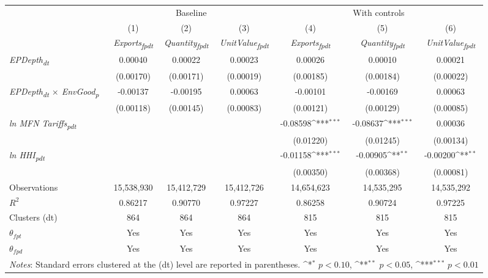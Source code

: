 {
\def\sym#1{\ifmmode^{#1}\else\(^{#1}\)\fi}
\begin{tabular}{l*{6}{c}}
\toprule
&\multicolumn{3}{c}{Baseline}&\multicolumn{3}{c}{With controls}\\\cmidrule(lr){2-4}\cmidrule(lr){5-7}
&(1)&(2)&(3)&(4)&(5)&(6)\\
&\textit{Exports\textsubscript{fpdt}}&\textit{Quantity\textsubscript{fpdt}}&\textit{UnitValue\textsubscript{fpdt}}&\textit{Exports\textsubscript{fpdt}}&\textit{Quantity\textsubscript{fpdt}}&\textit{UnitValue\textsubscript{fpdt}}\\
\midrule
\textit{EPDepth\textsubscript{dt}} & 0.00040 & 0.00022 & 0.00023 & 0.00026 & 0.00010 & 0.00021\\
 & (0.00170) & (0.00171) & (0.00019) & (0.00185) & (0.00184) & (0.00022)\\
\addlinespace
\textit{EPDepth\textsubscript{dt} $\times$ EnvGood\textsubscript{p}} & -0.00137 & -0.00195 & 0.00063 & -0.00101 & -0.00169 & 0.00063\\
 & (0.00118) & (0.00145) & (0.00083) & (0.00121) & (0.00129) & (0.00085)\\
\addlinespace
\textit{ln MFN Tariffs\textsubscript{pdt}} &  &  &  & -0.08598\sym{***} & -0.08637\sym{***} & 0.00036\\
 &  &  &  & (0.01220) & (0.01245) & (0.00134)\\
\addlinespace
\textit{ln HHI\textsubscript{pdt}} &  &  &  & -0.01158\sym{***} & -0.00905\sym{**} & -0.00200\sym{**}\\
 &  &  &  & (0.00350) & (0.00368) & (0.00081)\\
\midrule
Observations & 15,538,930 & 15,412,729 & 15,412,726 & 14,654,623 & 14,535,295 & 14,535,292\\
$R^{2}$ & 0.86217 & 0.90770 & 0.97227 & 0.86258 & 0.90724 & 0.97225\\
Clusters (dt) & 864 & 864 & 864 & 815 & 815 & 815\\
$\theta_{fpt}$ & Yes & Yes & Yes & Yes & Yes & Yes\\
$\theta_{fpd}$ & Yes & Yes & Yes & Yes & Yes & Yes\\
\bottomrule
\multicolumn{7}{l}{\footnotesize \textit{Notes}: Standard errors clustered at the (dt) level are reported in parentheses. \sym{*} \(p<0.10\), \sym{**} \(p<0.05\), \sym{***} \(p<0.01\)}\\
\end{tabular}
}
